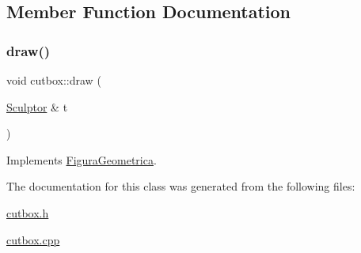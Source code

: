 \subsection{Member Function Documentation}
\mbox{\label{classcutbox_a4ba67b689b29c977d4162109bf2f929b}} 
\subsubsection{\texorpdfstring{draw()}{draw()}}
{\footnotesize\ttfamily void cutbox\+::draw (\begin{DoxyParamCaption}\item[{\mbox{\hyperlink{class_sculptor}{Sculptor}} \&}]{t }\end{DoxyParamCaption})\hspace{0.3cm}{\ttfamily [virtual]}}



Implements \mbox{\hyperlink{class_figura_geometrica_a34585fd7c0bd7378fc69c4ee208e676c}{Figura\+Geometrica}}.



The documentation for this class was generated from the following files\+:\begin{DoxyCompactItemize}
\item 
\mbox{\hyperlink{cutbox_8h}{cutbox.\+h}}\item 
\mbox{\hyperlink{cutbox_8cpp}{cutbox.\+cpp}}\end{DoxyCompactItemize}
